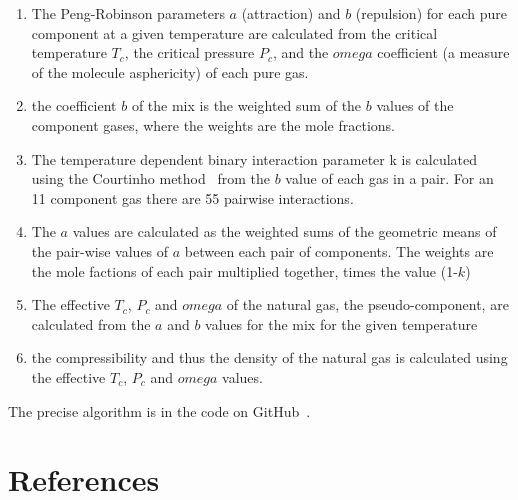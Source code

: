 \documentclass[5p]{elsarticle} %
\begin{document}
\begin{enumerate}
\item The Peng-Robinson\citep{Pina-Martinez2019} parameters $a$ (attraction) and $b$ (repulsion) for each pure component at a given temperature are calculated from the critical temperature $T_c$, the critical pressure $P_c$, and the $omega$ coefficient (a measure of the molecule asphericity) of each pure gas.
    \item the coefficient $b$ of the mix is  the weighted sum of the $b$ values of the component gases, where the weights are the mole fractions. 
    \item The temperature dependent binary interaction parameter k is calculated using the Courtinho method~\cite{Privat2023} from the $b$ value of each gas in a pair. For an 11 component gas there are 55 pairwise interactions.
    \item The $a$ values are calculated as the weighted sums of the geometric means of the pair-wise values of $a$ between each pair of components. The weights are the mole factions of each pair multiplied together, times the value (1-$k$)
    \item The effective $T_c$, $P_c$ and $omega$ of the natural gas, the pseudo-component,  are calculated from the $a$ and $b$ values for the mix for the given temperature
    \item the compressibility and thus the density of the natural gas is calculated using the effective $T_c$, $P_c$ and $omega$ values.
\end{enumerate}
The precise algorithm is in the code on GitHub~\cite{Sargents_github}.
\section{References}

\end{document}
